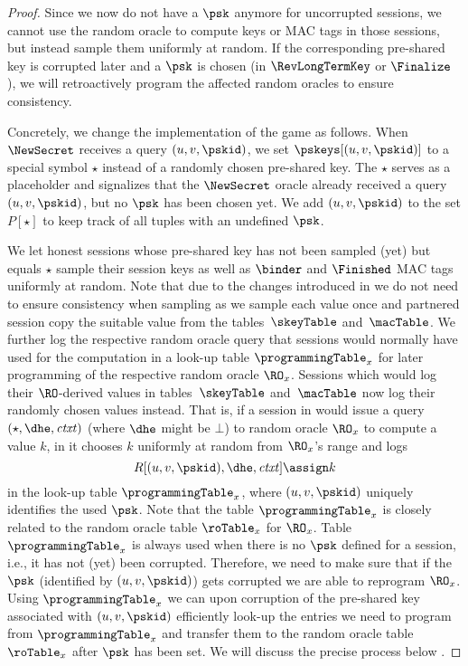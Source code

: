\begin{proof}
	Since we now do not have a $\psk$ anymore for uncorrupted sessions, we cannot use the random oracle to compute keys or MAC tags in those sessions, but instead sample them uniformly at random.
	If the corresponding pre-shared key is corrupted later and a $\psk$ is chosen (in $\RevLongTermKey$ or $\Finalize$ ), we will retroactively program the affected random oracles to ensure consistency.
		
	Concretely, we change the implementation of the game as follows.
	When $\NewSecret$ receives a query $(u,v,\pskid)$, we set $\pskeys[ (u,v,\pskid) ]$ to a special symbol $\star$ instead of a randomly chosen pre-shared key.
	The $\star$ serves as a placeholder and signalizes that the $\NewSecret$ oracle already received a query $(u,v,\pskid)$, but no $\psk$ has been chosen yet.
	We add $(u,v,\pskid)$ to the set $P[\star]$ to keep track of all tuples with an undefined $\psk$.
	
	We let honest sessions whose pre-shared key has not been sampled (yet) but equals $\star$ sample their session keys as well as $\binder$ and $\Finished$ MAC tags uniformly at random.
	Note that due to the changes introduced in  we do not need to ensure consistency when sampling as we sample each value once and partnered session copy the suitable value from the tables~$\skeyTable$ and~$\macTable$.
	We further log the respective random oracle query that sessions would normally have used for the computation in a look-up table $\programmingTable_x$ for later programming of the respective random oracle $\RO_x$.
	Sessions which would log their $\RO$-derived values in tables~$\skeyTable$ and~$\macTable$ now log their randomly chosen values instead. 
	That is, if a session in \prevGameText would issue a query $(\star, \dhe, \mathit{ctxt})$ (where $\dhe$ might be $\bot$) to random oracle $\RO_x$ to compute a value $k$, in \thisGame it chooses $k$ uniformly at random from $\RO_x$'s range and logs 
	\[
		R[ (u,v, \pskid) , \dhe , \mathit{ctxt} ] \assign k
	\]
	in the look-up table $\programmingTable_x$, where $(u,v, \pskid)$ uniquely identifies the used $\psk$.
	Note that the table $\programmingTable_x$ is closely related to the random oracle table $\roTable_x$ for $\RO_x$.
	Table $\programmingTable_x$ is always used when there is no $\psk$ defined for a session, i.e., it has not (yet) been corrupted.
	Therefore, we need to make sure that if the $\psk$ (identified by $(u,v,\pskid)$) gets corrupted we are able to reprogram $\RO_x$.
	Using $\programmingTable_x$ we can upon corruption of the pre-shared key associated with $(u,v,\pskid)$ efficiently look-up the entries we need to program from $\programmingTable_x$ and transfer them to the random oracle table~$\roTable_x$ after $\psk$ has been set.
	We will discuss the precise process below .
	

\end{proof}

